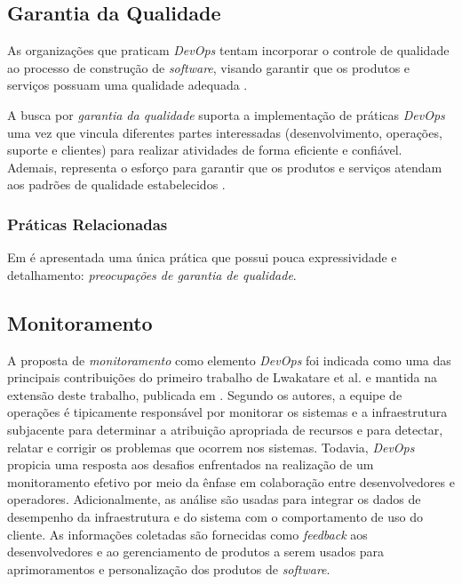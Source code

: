 \subsection{Garantia da Qualidade}

As organizações que praticam \textit{DevOps} tentam incorporar o controle de
qualidade ao processo de construção de \textit{software}, visando garantir
que os produtos e serviços possuam uma qualidade adequada
\cite{qualitative_devops_journalsw_17}.

A busca por \emph{garantia da qualidade} suporta a implementação de práticas
\textit{DevOps} uma vez que vincula diferentes partes interessadas
(desenvolvimento, operações, suporte e clientes) para realizar atividades de
forma eficiente e confiável. Ademais, representa o esforço para garantir que
os produtos e serviços atendam aos padrões de qualidade estabelecidos
\cite{characterizing_devops}.

\subsubsection{Práticas Relacionadas}

Em \cite{characterizing_devops} é apresentada uma única prática que possui
pouca expressividade e detalhamento: \emph{preocupações de garantia de
qualidade}.

\subsection{Monitoramento}

A proposta de \emph{monitoramento} como elemento \textit{DevOps} foi indicada
como uma das principais contribuições do primeiro trabalho de Lwakatare et al.
\cite{dimensions_of_devops} e mantida na extensão deste trabalho, publicada
em \cite{extending_dimensions}. Segundo os autores, a equipe de
operações é tipicamente responsável por monitorar os sistemas e a
infraestrutura subjacente para determinar a atribuição apropriada de recursos e
para detectar, relatar e corrigir os problemas que ocorrem nos sistemas.
Todavia, \textit{DevOps} propicia uma resposta aos desafios enfrentados na
realização de um monitoramento efetivo por meio da ênfase em colaboração entre
desenvolvedores e operadores. Adicionalmente, as análise são usadas para
integrar os dados de desempenho da infraestrutura e do sistema com o
comportamento de uso do cliente. As informações coletadas são fornecidas como
\textit{feedback} aos desenvolvedores e ao gerenciamento de produtos a serem
usados para aprimoramentos e personalização dos produtos de \textit{software}.

